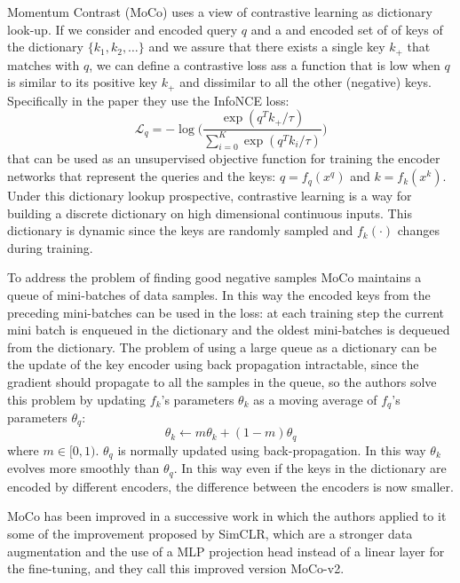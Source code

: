 Momentum Contrast (MoCo) \cite{he2020momentum} uses a view of contrastive learning as dictionary look-up. If we consider and encoded query $q$ and a and encoded set of of keys of the dictionary $\{k_1, k_2, \dots\}$ and we assure that there exists a single key $k_+$ that matches with $q$, we can define a contrastive loss ass a function that is low when $q$ is similar to its positive key $k_+$ and dissimilar to all the other (negative) keys. Specifically in the paper they use the InfoNCE loss: 
\[ \mathcal{L}_q = - \log\Bigg( \frac{\exp(q^Tk_+/\tau)}{\sum_{i=0}^K \exp(q^T k_i/\tau)}\Bigg)\]
that can be used as an unsupervised objective function for training the encoder networks that represent the queries and the keys: $q = f_q(x^q)$ and $k = f_k(x^k)$. Under this dictionary lookup prospective, contrastive learning is a way for building a discrete dictionary on high dimensional continuous inputs. This dictionary is dynamic since the keys are randomly sampled and $f_k(\cdot)$ changes during training. 

To address the problem of finding good negative samples MoCo maintains a queue of mini-batches of data samples. In this way the encoded keys from the preceding mini-batches can be used in the loss: at each training step the current mini batch is enqueued in the dictionary and the oldest mini-batches is dequeued from the dictionary. The problem of using a large queue as a dictionary can be the update of the key encoder using back propagation intractable, since the gradient should propagate to all the samples in the queue, so the authors solve this problem by updating $f_k$'s parameters $\theta_k$ as a moving average of $f_q$'s parameters $\theta_q$:
\[\theta_k \leftarrow m\theta_k + (1-m)\theta_q \]
where $m \in [0,1)$. $\theta_q$ is normally updated using back-propagation. In this way $\theta_k$ evolves more smoothly than $\theta_q$. In this way even if the keys in the dictionary are encoded by different encoders, the difference between the encoders is now smaller.

MoCo has been improved in a successive work \cite{chen2020simple} in which the authors applied to it some of the improvement proposed by SimCLR, which are a stronger data augmentation and the use of a MLP projection head instead of a linear layer for the fine-tuning, and they call this improved version MoCo-v2.